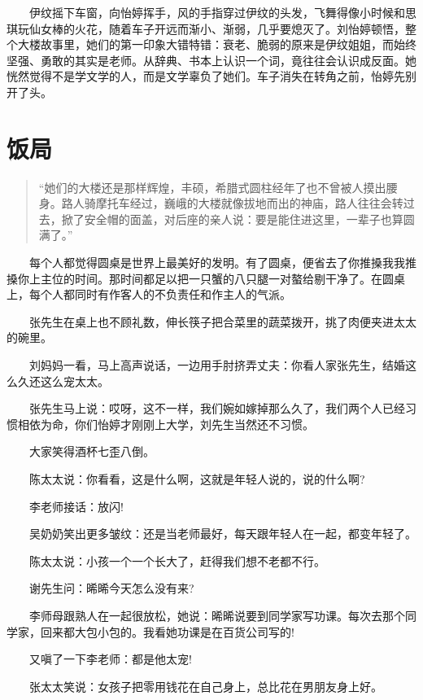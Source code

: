 \documentclass[12pt,UTF8]{ctexbook}
\begin{document}
　　伊纹摇下车窗，向怡婷挥手，风的手指穿过伊纹的头发，飞舞得像小时候和思琪玩仙女棒的火花，随着车子开远而渐小、渐弱，几乎要熄灭了。刘怡婷顿悟，整个大楼故事里，她们的第一印象大错特错：衰老、脆弱的原来是伊纹姐姐，而始终坚强、勇敢的其实是老师。从辞典、书本上认识一个词，竟往往会认识成反面。她恍然觉得不是学文学的人，而是文学辜负了她们。车子消失在转角之前，怡婷先别开了头。

\hypertarget{ux996dux5c40-1}{%
\section*{饭局}\label{ux996dux5c40-1}}

\begin{quote}
\enquote{她们的大楼还是那样辉煌，丰硕，希腊式圆柱经年了也不曾被人摸出腰身。路人骑摩托车经过，巍峨的大楼就像拔地而出的神庙，路人往往会转过去，掀了安全帽的面盖，对后座的亲人说：要是能住进这里，一辈子也算圆满了。}
\end{quote}

　　每个人都觉得圆桌是世界上最美好的发明。有了圆桌，便省去了你推搡我我推搡你上主位的时间。那时间都足以把一只蟹的八只腿一对螯给剔干净了。在圆桌上，每个人都同时有作客人的不负责任和作主人的气派。

　　张先生在桌上也不顾礼数，伸长筷子把合菜里的蔬菜拨开，挑了肉便夹进太太的碗里。

　　刘妈妈一看，马上高声说话，一边用手肘挤弄丈夫：你看人家张先生，结婚这么久还这么宠太太。

　　张先生马上说：哎呀，这不一样，我们婉如嫁掉那么久了，我们两个人已经习惯相依为命，你们怡婷才刚刚上大学，刘先生当然还不习惯。

　　大家笑得酒杯七歪八倒。

　　陈太太说：你看看，这是什么啊，这就是年轻人说的，说的什么啊?

　　李老师接话：放闪!

　　吴奶奶笑出更多皱纹：还是当老师最好，每天跟年轻人在一起，都变年轻了。

　　陈太太说：小孩一个一个长大了，赶得我们想不老都不行。

　　谢先生问：晞晞今天怎么没有来?

　　李师母跟熟人在一起很放松，她说：晞晞说要到同学家写功课。每次去那个同学家，回来都大包小包的。我看她功课是在百货公司写的!

　　又嗔了一下李老师：都是他太宠!

　　张太太笑说：女孩子把零用钱花在自己身上，总比花在男朋友身上好。
\end{document}
